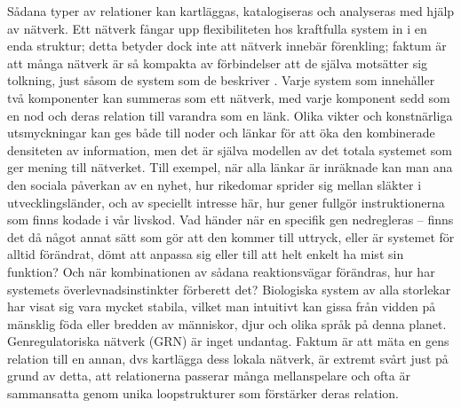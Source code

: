 Sådana typer av relationer kan kartläggas, katalogiseras och analyseras med hjälp av nätverk. Ett nätverk fångar upp flexibiliteten hos kraftfulla system in i en enda struktur; detta betyder dock inte att nätverk innebär förenkling; faktum är att många nätverk är så kompakta av förbindelser att de själva motsätter sig tolkning, just såsom de system som de beskriver \citep{dianati2016unwinding}. Varje system som innehåller två komponenter kan summeras som ett nätverk, med varje komponent sedd som en nod och deras relation till varandra som en länk. Olika vikter och konstnärliga utsmyckningar kan ges både till noder och länkar för att öka den kombinerade densiteten av information, men det är själva modellen av det totala systemet som ger mening till nätverket. Till exempel, när alla länkar är inräknade kan man ana den sociala påverkan av en nyhet, hur rikedomar sprider sig mellan släkter i utvecklingsländer, och av speciellt intresse här, hur gener fullgör instruktionerna som finns kodade i vår livskod. Vad händer när en specifik gen nedregleras – finns det då något annat sätt som gör att den kommer till uttryck, eller är systemet för alltid förändrat, dömt att anpassa sig eller till att helt enkelt ha mist sin funktion? Och när kombinationen av sådana reaktionsvägar förändras, hur har systemets överlevnadsinstinkter förberett det? Biologiska system av alla storlekar har visat sig vara mycket stabila, vilket man intuitivt kan gissa från vidden på mänsklig föda eller bredden av människor, djur och olika språk på denna planet. Genregulatoriska nätverk (GRN) är inget undantag. Faktum är att mäta en gens relation till en annan, dvs kartlägga dess lokala nätverk, är extremt svårt just på grund av detta, att relationerna passerar många mellanspelare och ofta är sammansatta genom unika loopstrukturer som förstärker deras relation.

